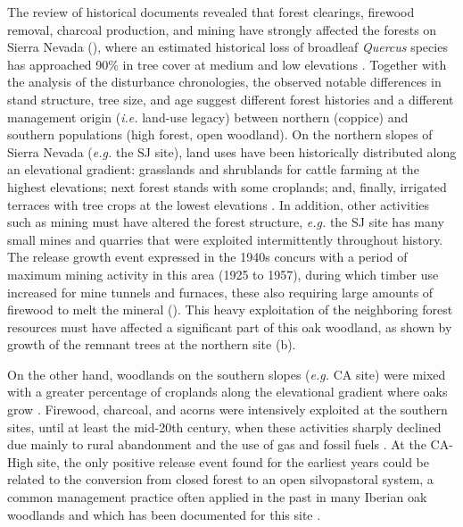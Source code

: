 The review of historical documents revealed that forest clearings, firewood removal, charcoal production, and mining have strongly affected the forests on Sierra Nevada (), where an estimated historical loss of broadleaf \emph{Quercus} species has approached 90\% in tree cover at medium and low elevations \autocite{JimenezOlivenciaetal2015MedioSiglo}. Together with the analysis of the disturbance chronologies, the observed notable differences in stand structure, tree size, and age suggest different forest histories and a different management origin (\emph{i.e.} land-use legacy) between northern (coppice) and southern populations (high forest, open woodland). On the northern slopes of Sierra Nevada (\emph{e.g.} the SJ site), land uses have been historically distributed along an elevational gradient: grasslands and shrublands for cattle farming at the highest elevations; next forest stands with some croplands; and, finally, irrigated terraces with tree crops at the lowest elevations \autocite{JimenezOlivenciaetal2015MedioSiglo}. In addition, other activities such as mining must have altered the forest structure, \emph{e.g.} the SJ site has many small mines and quarries that were exploited intermittently throughout history. The release growth event expressed in the 1940s concurs with a period of maximum mining activity in this area (1925 to 1957), during which timber use increased for mine tunnels and furnaces, these also requiring large amounts of firewood to melt the mineral (). This heavy exploitation of the neighboring forest resources must have affected a significant part of this oak woodland, as shown by growth of the remnant trees at the northern site (b).

On the other hand, woodlands on the southern slopes (\emph{e.g.} CA site) were mixed with a greater percentage of croplands along the elevational gradient where oaks grow \autocite{JimenezOlivenciaetal2015MedioSiglo}. Firewood, charcoal, and acorns were intensively exploited at the southern sites, until at least the mid-20th century, when these activities sharply declined due mainly to rural abandonment and the use of gas and fossil fuels \autocite{ValbuenaCarabanaGil2013GeneticResilience}. At the CA-High site, the only positive release event found for the earliest years could be related to the conversion from closed forest to an open silvopastoral system, a common management practice often applied in the past in many Iberian oak woodlands \autocite{Canellasetal2004GrowthResponse,GeaIzquierdoetal2011TreeringsReflect} and which has been documented for this site \autocite{ValbuenaCarabanaGil2013GeneticResilience}.


